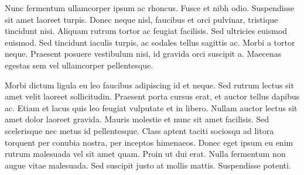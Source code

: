 \documentclass[10pt, a4paper, conference]{IEEEtran}
\begin{document}
Nunc fermentum ullamcorper ipsum ac rhoncus. Fusce et nibh odio. Suspendisse sit amet laoreet turpis. Donec neque nisl, faucibus et orci pulvinar, tristique tincidunt nisi. Aliquam rutrum tortor ac feugiat facilisis. Sed ultricies euismod euismod. Sed tincidunt iaculis turpis, ac sodales tellus sagittis ac. Morbi a tortor neque. Praesent posuere vestibulum nisi, id gravida orci suscipit a. Maecenas egestas sem vel ullamcorper pellentesque.

Morbi dictum ligula eu leo faucibus adipiscing id et neque. Sed rutrum lectus sit amet velit laoreet sollicitudin. Praesent porta cursus erat, et auctor tellus dapibus ac. Etiam et lacus quis leo feugiat vulputate et in libero. Nullam auctor lectus sit amet dolor laoreet gravida. Mauris molestie et nunc sit amet facilisis. Sed scelerisque nec metus id pellentesque. Class aptent taciti sociosqu ad litora torquent per conubia nostra, per inceptos himenaeos. Donec eget ipsum eu enim rutrum malesuada vel sit amet quam. Proin ut dui erat. Nulla fermentum non augue vitae malesuada. Sed suscipit justo at mollis mattis. Suspendisse potenti.
\end{document}
